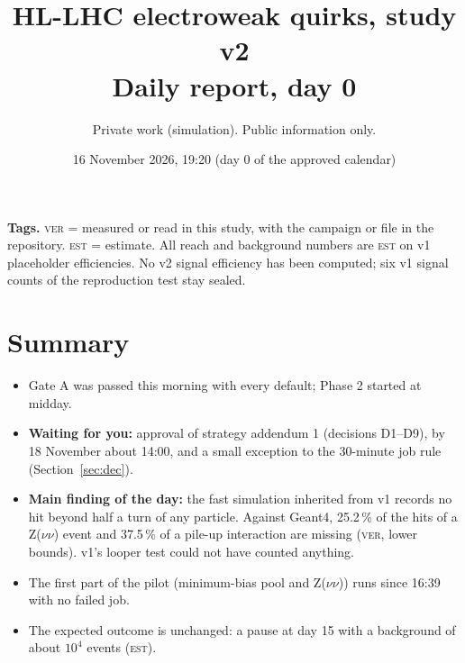 \documentclass[11pt,a4paper]{article}
\title{HL-LHC electroweak quirks, study v2\\[2pt]\large Daily report, day 0}
\author{Private work (simulation). Public information only.}
\date{16 November 2026, 19:20 (day 0 of the approved calendar)}
\newcommand{\est}{\textsc{est}}
\newcommand{\ver}{\textsc{ver}}
\begin{document}
\maketitle

\noindent\textbf{Tags.} \ver{} = measured or read in this study, with the campaign or file in the repository.
\est{} = estimate. All reach and background numbers are \est{} on v1 placeholder efficiencies. No v2 signal
efficiency has been computed; six v1 signal counts of the reproduction test stay sealed.

\section{Summary}
\begin{itemize}
\item Gate A was passed this morning with every default; Phase 2 started at midday.
\item \textbf{Waiting for you:} approval of strategy addendum 1 (decisions D1--D9), by 18 November about 14:00,
      and a small exception to the 30-minute job rule (Section~\ref{sec:dec}).
\item \textbf{Main finding of the day:} the fast simulation inherited from v1 records no hit beyond half a turn of
      any particle. Against Geant4, 25.2\,\% of the hits of a Z($\nu\nu$) event and 37.5\,\% of a pile-up
      interaction are missing (\ver, lower bounds). v1's looper test could not have counted anything.
\item The first part of the pilot (minimum-bias pool and Z($\nu\nu$)) runs since 16:39 with no failed job.
\item The expected outcome is unchanged: a pause at day 15 with a background of about $10^{4}$ events (\est).
\end{itemize}
\end{document}
